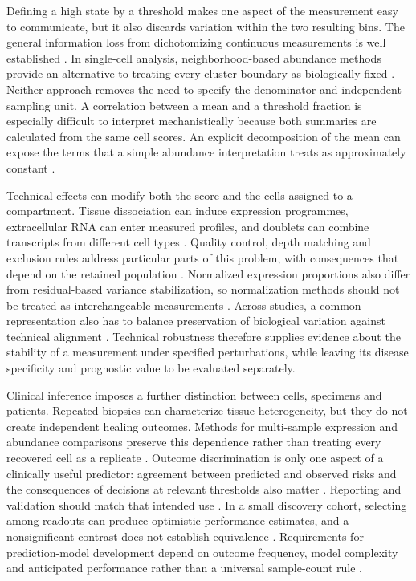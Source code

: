 \documentclass[10pt,a4paper]{article}
\begin{document}
Defining a high state by a threshold makes one aspect of the measurement easy to communicate, but it also discards variation within the two resulting bins. The general information loss from dichotomizing continuous measurements is well established \citep{altman2006}. In single-cell analysis, neighborhood-based abundance methods provide an alternative to treating every cluster boundary as biologically fixed \citep{dann2022}. Neither approach removes the need to specify the denominator and independent sampling unit. A correlation between a mean and a threshold fraction is especially difficult to interpret mechanistically because both summaries are calculated from the same cell scores. An explicit decomposition of the mean can expose the terms that a simple abundance interpretation treats as approximately constant \citep{buettner2021}.

Technical effects can modify both the score and the cells assigned to a compartment. Tissue dissociation can induce expression programmes, extracellular RNA can enter measured profiles, and doublets can combine transcripts from different cell types \citep{vandenbrink2017,young2020,wolock2019}. Quality control, depth matching and exclusion rules address particular parts of this problem, with consequences that depend on the retained population \citep{heumos2023}. Normalized expression proportions also differ from residual-based variance stabilization, so normalization methods should not be treated as interchangeable measurements \citep{hafemeister2019}. Across studies, a common representation also has to balance preservation of biological variation against technical alignment \citep{luecken2022}. Technical robustness therefore supplies evidence about the stability of a measurement under specified perturbations, while leaving its disease specificity and prognostic value to be evaluated separately.

Clinical inference imposes a further distinction between cells, specimens and patients. Repeated biopsies can characterize tissue heterogeneity, but they do not create independent healing outcomes. Methods for multi-sample expression and abundance comparisons preserve this dependence rather than treating every recovered cell as a replicate \citep{crowell2020,squair2021,zimmerman2021,lazic2010}. Outcome discrimination is only one aspect of a clinically useful predictor: agreement between predicted and observed risks and the consequences of decisions at relevant thresholds also matter \citep{steyerberg2010,vancalster2019,vickers2006}. Reporting and validation should match that intended use \citep{collins2015}. In a small discovery cohort, selecting among readouts can produce optimistic performance estimates, and a nonsignificant contrast does not establish equivalence \citep{cawley2010,schuirmann1987,lakens2017}. Requirements for prediction-model development depend on outcome frequency, model complexity and anticipated performance rather than a universal sample-count rule \citep{riley2019}.
\end{document}
